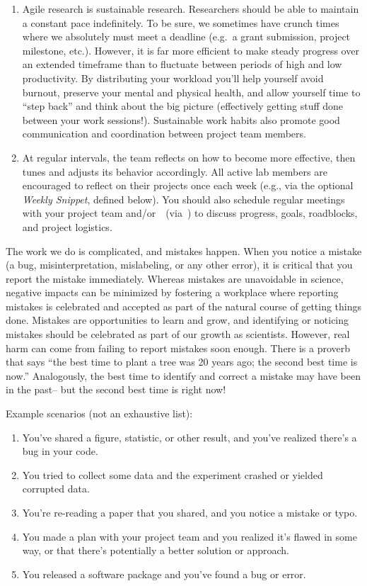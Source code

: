 \documentclass{tufte-book} %
\begin{document}
\begin{enumerate}
\item Agile research is sustainable research.  Researchers should be
  able to maintain a constant pace indefinitely.  To be sure, we
  sometimes have crunch times where we absolutely must meet a deadline
  (e.g.\ a grant submission, project milestone, etc.).  However, it is
  far more efficient to make steady progress over an extended
  timeframe than to fluctuate between periods of high and low
  productivity.  By distributing your workload you'll help yourself
  avoid burnout, preserve your mental and physical health, and allow
  yourself time to ``step back'' and think about the big picture
  (effectively getting stuff done between your work sessions!).
  Sustainable work habits also promote good communication and
  coordination between project team members.

\item At regular intervals, the team reflects on how to become more effective,
then tunes and adjusts its behavior accordingly. All active lab
members are encouraged to reflect on their projects once each week (e.g., via the optional \textit{Weekly
Snippet}, defined below). You should also schedule regular meetings with your
project team and/or~\director~(via~\meeting) to discuss progress, goals,
roadblocks, and project logistics.

\end{enumerate}


\noindent The work we do is complicated, and mistakes happen.  When
you notice a mistake (a bug, misinterpretation, mislabeling, or any
other error), it is critical that you report the mistake immediately.
Whereas mistakes are unavoidable in science, negative impacts can be
minimized by fostering a workplace where reporting mistakes is
celebrated and accepted as part of the natural course of getting
things done.  Mistakes are opportunities to learn and grow, and
identifying or noticing mistakes should be celebrated as part of our
growth as scientists.  However, real harm can come from failing to
report mistakes soon enough.  There is a proverb that says ``the best
time to plant a tree was 20 years ago; the second best time is now.''
Analogously, the best time to identify and correct a mistake may have
been in the past-- but the second best time is right now!

Example scenarios (not an exhaustive list):
\begin{enumerate}
  \item You've shared a figure, statistic, or other result, and
    you've realized there's a bug in your code.
  \item You tried to collect some data and the experiment crashed or
    yielded corrupted data.
  \item You're re-reading a paper that you shared, and you notice a
    mistake or typo.
  \item You made a plan with your project team and you realized it's
    flawed in some way, or that there's potentially a better solution
    or approach.
  \item You released a software package and you've found a bug or error.
\end{enumerate}
\end{document}
